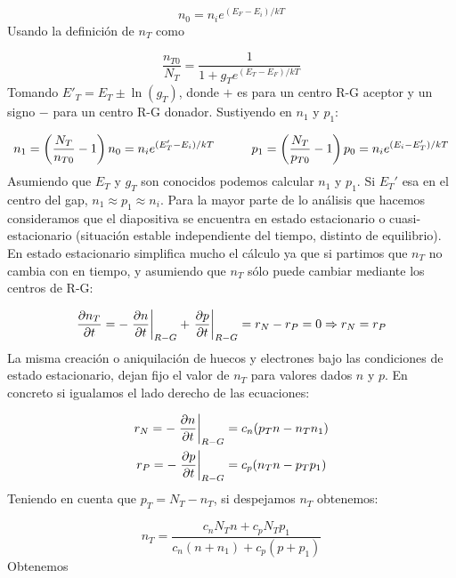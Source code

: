 \begin{equation}
	n_0 = n_i e^{(E_F-E_i)/kT}
\end{equation}
Usando la definición de $n_T$ como

\begin{equation}
	\frac{n_{T0}}{N_T} = \frac{1}{1+g_T e^{(E_T-E_F)/kT}}
\end{equation}
Tomando $E'_T=E_T\pm\ln(g_T)$, donde $+$ es para un centro R-G aceptor y un signo $-$ para un centro R-G donador. Sustiyendo en $n_1$ y $p_1$:

\begin{equation}
	n_1 = \left( \frac{N_T}{n_{T0}}-1 \right) n_0 = n_i e^{(E_T'-E_i)/kT} \quad \quad \quad
	p_1 = \left( \frac{N_T}{p_{T0}}-1 \right) p_0 = n_i e^{(E_i-E_T')/kT}
\end{equation}
Asumiendo que $E_T$ y $g_T$ son conocidos podemos calcular $n_1$ y $p_1$. Si $E_T'$ esa en el centro del gap, $n_1\approx p_1 \approx n_i$. Para la mayor parte de lo análisis que hacemos consideramos que el diapositiva se encuentra en estado estacionario o cuasi-estacionario (situación estable independiente del tiempo, distinto de equilibrio). En estado estacionario simplifica mucho el cálculo ya que si partimos que $n_T$ no cambia con en tiempo, y asumiendo que $n_T$ sólo puede cambiar mediante los centros de R-G:

\begin{equation}
	\parciales{n_T}{t} = - \eval{\parciales{n}{t}}_{R-G} + \eval{\parciales{p}{t}}_{R-G} = r_N - r_P = 0 \Rightarrow r_N = r_P
\end{equation}
La misma creación o aniquilación de huecos y electrones bajo las condiciones de estado estacionario, dejan fijo el valor de $n_T$ para valores dados $n$ y $p$. En concreto si igualamos el lado derecho de las ecuaciones:

\begin{equation}
	\begin{split}
		r_N = - \eval{\parciales{n}{t}}_{R-G} & = c_n (p_Tn - n_T n_1) \\
		r_P = - \eval{\parciales{p}{t}}_{R-G} & = c_p (n_Tn - p_T p_1)
	\end{split}
\end{equation}
Teniendo en cuenta que $p_T=N_T-n_T$, si despejamos $n_T$ obtenemos:

\begin{equation}
	n_T = \frac{c_n N_T n + c_p N_T p_1}{c_n(n+n_1)+c_p(p+p_1)}
\end{equation}
Obtenemos

